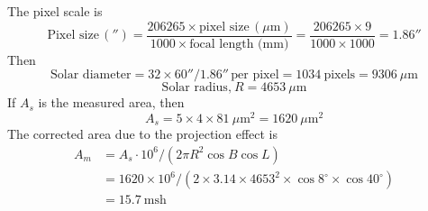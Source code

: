 The pixel scale is
\begin{equation*}
\text{Pixel size}\,('') = \frac{206265 \times \text{pixel size}\,(\mu\mathrm{m})}{1000 \times \text{focal length (mm)}}
= \frac{206265 \times 9}{1000 \times 1000} = 1.86'' \tag*{(30\%)}
\end{equation*}
Then
\[
\text{Solar diameter} = 32 \times 60''/1.86''\,\text{per pixel} = 1034~\text{pixels} = 9306~\mu\mathrm{m}
\]
\begin{equation*}
\text{Solar radius,}\ R = 4653~\mu\mathrm{m} \tag*{(25\%)}
\end{equation*}
If $A_s$ is the measured area, then
\begin{equation*}
A_s = 5 \times 4 \times 81~\mu\mathrm{m}^2 = 1620~\mu\mathrm{m}^2 \tag*{(15\%)}
\end{equation*}
The corrected area due to the projection effect is
\begin{align*}
A_m &= A_s \cdot 10^6/(2\pi R^2 \cos B \cos L)\\
    &= 1620 \times 10^6/(2 \times 3.14 \times 4653^2 \times \cos 8^\circ \times \cos 40^\circ)\\
    &= 15.7~\mathrm{msh} \tag*{(30\%)}
\end{align*}
